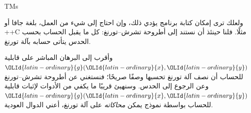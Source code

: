 \documentclass[../../../include/open-logic-section]{subfiles}
\begin{document}
\begin{tagblock}{TMs}
\begin{digress}
ولعلك ترى إمكان كتابة برنامج يؤدي ذلك، وإن احتاج إلى شيء من العمل،
بلغة جافا أو ++C مثلًا. فلنا حينئذ أن نستند إلى أطروحة
تشرش--تورنغ: كل ما يقبل الحساب بحسب الحدس يتأتى
حسابه بآلة تورنغ.

وأقرب إلى البرهان المباشر على قابلية $\OLId{latin-ordinary}{g}(\OLId{latin-ordinary}{x},\OLId{latin-ordinary}{y})$ للحساب أن نصف آلة
تورنغ تحسبها وصفًا صريحًا؛ فنستغني عن أطروحة تشرش--تورنغ
وعن الرجوع إلى الحدس. وسنهيئ قريبًا ما يكفي من الأدوات لإثبات
قابلية $\OLId{latin-ordinary}{g}(\OLId{latin-ordinary}{x},\OLId{latin-ordinary}{y})$ للحساب بواسطة نموذج يمكن
\emph{محاكاته} على آلة تورنغ، أعني الدوال العودية.
\end{digress}
\end{tagblock}
\end{document}

